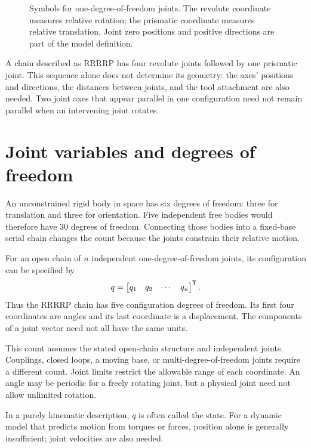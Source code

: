 \begin{figure}[htbp]
\centering
\caption{Symbols for one-degree-of-freedom joints. The revolute coordinate
measures relative rotation; the prismatic coordinate measures relative
translation. Joint zero positions and positive directions are part of the
model definition.}
\label{fig:l10-joints}
\end{figure}

A chain described as RRRRP has four revolute joints followed by one
prismatic joint. This sequence alone does not determine its geometry:
the axes' positions and directions, the distances between joints, and
the tool attachment are also needed. Two joint axes that appear parallel
in one configuration need not remain parallel when an intervening joint
rotates.

\section{Joint variables and degrees of freedom}
An unconstrained rigid body in space has six degrees of freedom: three
for translation and three for orientation. Five independent free bodies
would therefore have 30 degrees of freedom. Connecting those bodies into
a fixed-base serial chain changes the count because the joints constrain
their relative motion.

For an open chain of $n$ independent one-degree-of-freedom joints, its
configuration can be specified by
\begin{equation}
 q=\begin{bmatrix}q_1&q_2&\cdots&q_n\end{bmatrix}^{\mathsf T}.
 \label{eq:l10-q}
\end{equation}
Thus the RRRRP chain has five configuration degrees of freedom. Its first
four coordinates are angles and its last coordinate is a displacement.
The components of a joint vector need not all have the same units.

This count assumes the stated open-chain structure and independent joints.
Couplings, closed loops, a moving base, or multi-degree-of-freedom joints
require a different count. Joint limits restrict the allowable range of
each coordinate. An angle may be periodic for a freely rotating joint,
but a physical joint need not allow unlimited rotation.

In a purely kinematic description, $q$ is often called the state. For a
dynamic model that predicts motion from torques or forces, position alone
is generally insufficient; joint velocities are also needed.

